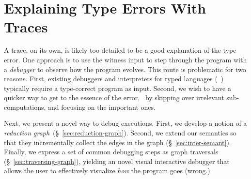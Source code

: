 \section{Explaining Type Errors With Traces}
\label{sec:explaining}

A trace, on its own, is likely too detailed to be a good
explanation of the type error. One approach is to use the
witness input to step through the program with a
\emph{debugger} to observe how the program evolves.
%
This route is problematic for two reasons.
%
First, existing debuggers and interpreters for
typed languages (\eg\ \ocaml) typically require
a type-correct program as input.
%
Second, we wish to have a quicker way to get
to the essence of the error, \eg\ by skipping
over irrelevant sub-computations, and focusing
on the important ones.

Next, we present a novel way to debug executions.
%
First, we develop a notion of a
\emph{reduction graph}~(\S~\ref{sec:reduction-graph}).
%
Second, we extend our semantics so that they incrementally
collect the edges in the graph (\S~\ref{sec:inter-semant}).
%
Finally, we express a set of common debugging steps as
graph traversals (\S~\ref{sec:traversing-graph}), yielding
an novel visual interactive debugger that allows the user
to effectively visualize \emph{how} the program goes (wrong.)


